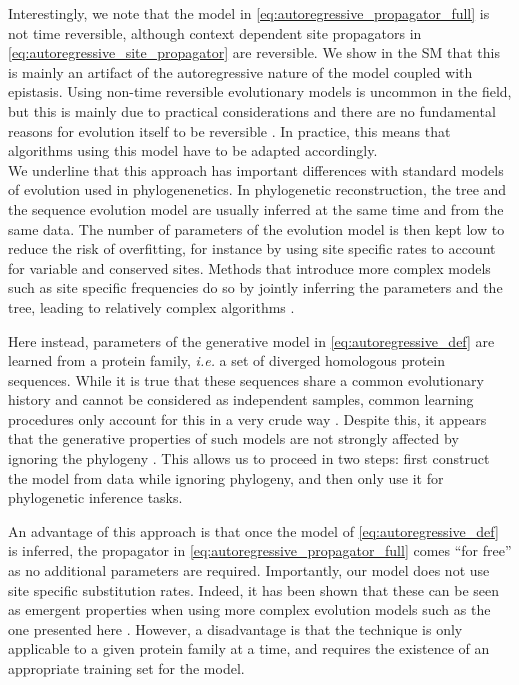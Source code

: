 Interestingly, we note that the model in \eqref{eq:autoregressive_propagator_full} is not time reversible, although context dependent site propagators in \eqref{eq:autoregressive_site_propagator} are reversible. 
We show in the SM that this is mainly an artifact of the autoregressive nature of the model coupled with epistasis. 
Using non-time reversible evolutionary models is uncommon in the field, but this is mainly due to practical considerations and there are no fundamental reasons for evolution itself to be reversible \cite{felsensteinjoseph_inferringphylogenies_2003}. 
In practice, this means that algorithms using this model have to be adapted accordingly. \\


We underline that this approach has important differences with standard models of evolution used in phylogenenetics. 
In phylogenetic reconstruction, the tree and the sequence evolution model are usually inferred at the same time and from the same data. 
The number of parameters of the evolution model is then kept low to reduce the risk of overfitting, for instance by using site specific rates to account for variable and conserved sites. 
Methods that introduce more complex models such as site specific frequencies do so by jointly inferring the parameters and the tree, leading to relatively complex algorithms \cite{halpern_evolutionarydistancesproteincoding_1998a,puller_efficientinferencepotential_2020}.

Here instead, parameters of the generative model in \eqref{eq:autoregressive_def} are learned from a protein family, \emph{i.e.} a set of diverged homologous protein sequences. 
While it is true that these sequences share a common evolutionary history and cannot be considered as independent samples, common learning procedures only account for this in a very crude way \cite{cocco_inversestatisticalphysics_2018,trinquier_efficientgenerativemodeling_2021}.
Despite this, it appears that the generative properties of such models are not strongly affected by ignoring the phylogeny \cite{hockenberry_phylogeneticweightingdoes_2019,rodriguezhorta_effectphylogeneticcorrelations_2021}. 
This allows us to proceed in two steps: first construct the model from data while ignoring phylogeny, and then only use it for phylogenetic inference tasks.

An advantage of this approach is that once the model of \eqref{eq:autoregressive_def} is inferred, the propagator in \eqref{eq:autoregressive_propagator_full} comes ``for free'' as no additional parameters are required. 
Importantly, our model does not use site specific substitution rates. 
Indeed, it has been shown that these can be seen as emergent properties when using more complex evolution models such as the one presented here \cite{delapaz_epistaticcontributionspromote_2020}.
However, a disadvantage is that the technique is only applicable to a given protein family at a time, and requires the existence of an appropriate training set for the model. 


